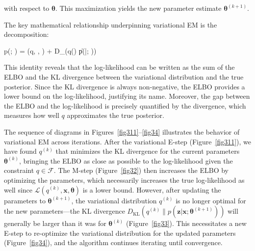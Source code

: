 with respect to $\boldsymbol{\theta}$. This maximization yields the new parameter estimate $\boldsymbol{\theta}^{(k+1)}$.

The key mathematical relationship underpinning variational EM is the decomposition:
\begin{myequation}
\log p(; \boldsymbol{\theta}) = (q, , \boldsymbol{\theta}) + D_{}(q() \| p(|; \boldsymbol{\theta}))
\end{myequation}

This identity reveals that the log-likelihood can be written as the sum of the ELBO and the KL divergence between the variational distribution and the true posterior. Since the KL divergence is always non-negative, the ELBO provides a lower bound on the log-likelihood, justifying its name. Moreover, the gap between the ELBO and the log-likelihood is precisely quantified by the divergence, which measures how well $q$ approximates the true posterior.

The sequence of diagrams in Figures~\ref{fig311}--\ref{fig34} illustrates the behavior of variational EM across iterations. After the variational E-step (Figure~\ref{fig311}), we have found $q^{(k)}$ that minimizes the KL divergence for the current parameters $\boldsymbol{\theta}^{(k)}$, bringing the ELBO as close as possible to the log-likelihood given the constraint $q \in \mathcal{F}$. The M-step (Figure~\ref{fig32}) then increases the ELBO by optimizing the parameters, which necessarily increases the true log-likelihood as well since $\mathcal{L}(q^{(k)}, \mathbf{x}, \boldsymbol{\theta})$ is a lower bound. However, after updating the parameters to $\boldsymbol{\theta}^{(k+1)}$, the variational distribution $q^{(k)}$ is no longer optimal for the new parameters—the KL divergence $D_{\text{KL}}(q^{(k)} \| p(\mathbf{z}|\mathbf{x}; \boldsymbol{\theta}^{(k+1)}))$ will generally be larger than it was for $\boldsymbol{\theta}^{(k)}$ (Figure~\ref{fig33}). This necessitates a new E-step to re-optimize the variational distribution for the updated parameters (Figure~\ref{fig34}), and the algorithm continues iterating until convergence.

